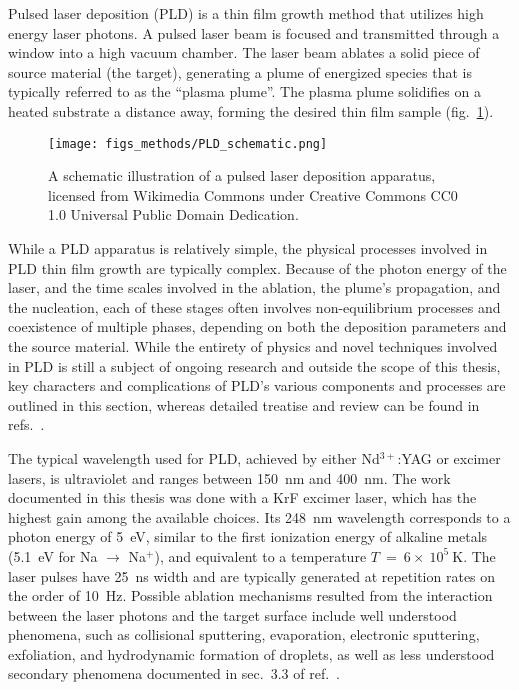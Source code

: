 Pulsed laser deposition (PLD) is a thin film growth method that utilizes high energy laser photons. A pulsed laser beam is focused and transmitted through a window into a high vacuum chamber. The laser beam ablates a solid piece of source material (the target), generating a plume of energized species that is typically referred to as the ``plasma plume''. The plasma plume solidifies on a heated substrate a distance away, forming the desired thin film sample (fig.~\ref{fig:PLD_schematic}). %
\begin{figure}[ht]%
	\centering%
    \texttt{[image: figs\_methods/PLD\_schematic.png]}%
    \caption[Schematic Illustration of a PLD apparatus]{\label{fig:PLD_schematic}A schematic illustration of a pulsed laser deposition apparatus, licensed from Wikimedia Commons under Creative Commons CC0 1.0 Universal Public Domain Dedication.}%
\end{figure}%
While a PLD apparatus is relatively simple, the physical processes involved in PLD thin film growth are typically complex. Because of the photon energy of the laser, and the time scales involved in the ablation, the plume's propagation, and the nucleation, each of these stages often involves non-equilibrium processes and coexistence of multiple phases, depending on both the deposition parameters and the source material. While the entirety of physics and novel techniques involved in PLD is still a subject of ongoing research and outside the scope of this thesis, key characters and complications of PLD's various components and processes are outlined in this section, whereas detailed treatise and review can be found in refs.~\cite{PLD_book, PLD_review}.

The typical wavelength used for PLD, achieved by either Nd$^{3+}$:YAG or excimer lasers, is ultraviolet and ranges between \SI{150}{nm} and \SI{400}{nm}. The work documented in this thesis was done with a KrF excimer laser, which has the highest gain among the available choices. Its \SI{248}{nm} wavelength corresponds to a photon energy of \SI{5}{eV}, similar to the first ionization energy of alkaline metals (\SI{5.1}{eV} for Na $\to$ Na$^+$), and equivalent to a temperature $T~=~6 \times~10^5~\mathrm{K}$. The laser pulses have \SI{25}{ns} width and are typically generated at repetition rates on the order of \SI{10}{Hz}. Possible ablation mechanisms resulted from the interaction between the laser photons and the target surface include well understood phenomena, such as collisional sputtering, evaporation, electronic sputtering, exfoliation, and hydrodynamic formation of droplets, as well as less understood secondary phenomena documented in sec.~3.3 of ref.~\cite{PLD_book}.

